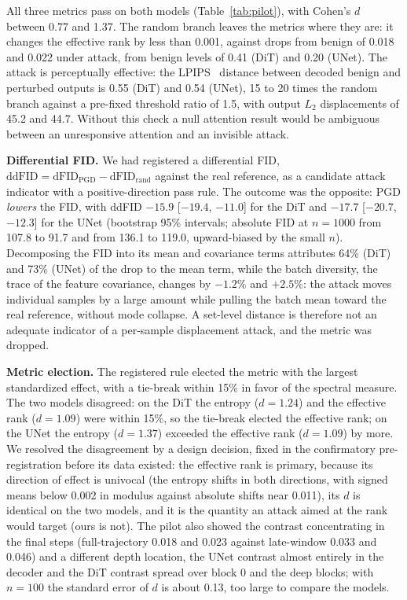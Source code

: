\documentclass{article}
\begin{document}
All three metrics pass on both models (Table~\ref{tab:pilot}), with Cohen's $d$ between 0.77 and 1.37. The random branch leaves the metrics where they are: it changes the effective rank by less than 0.001, against drops from benign of 0.018 and 0.022 under attack, from benign levels of 0.41 (DiT) and 0.20 (UNet). The attack is perceptually effective: the LPIPS~\cite{zhang2018unreasonable} distance between decoded benign and perturbed outputs is 0.55 (DiT) and 0.54 (UNet), 15 to 20 times the random branch against a pre-fixed threshold ratio of 1.5, with output $L_2$ displacements of 45.2 and 44.7. Without this check a null attention result would be ambiguous between an unresponsive attention and an invisible attack.

\textbf{Differential FID.} We had registered a differential FID, $\mathrm{ddFID} = \mathrm{dFID}_{\mathrm{PGD}} - \mathrm{dFID}_{\mathrm{rand}}$ against the real reference, as a candidate attack indicator with a positive-direction pass rule. The outcome was the opposite: PGD \textit{lowers} the FID, with ddFID $-15.9$ [$-19.4$, $-11.0$] for the DiT and $-17.7$ [$-20.7$, $-12.3$] for the UNet (bootstrap 95\% intervals; absolute FID at $n{=}1000$ from 107.8 to 91.7 and from 136.1 to 119.0, upward-biased by the small $n$). Decomposing the FID into its mean and covariance terms attributes 64\% (DiT) and 73\% (UNet) of the drop to the mean term, while the batch diversity, the trace of the feature covariance, changes by $-1.2\%$ and $+2.5\%$: the attack moves individual samples by a large amount while pulling the batch mean toward the real reference, without mode collapse. A set-level distance is therefore not an adequate indicator of a per-sample displacement attack, and the metric was dropped.

\textbf{Metric election.} The registered rule elected the metric with the largest standardized effect, with a tie-break within 15\% in favor of the spectral measure. The two models disagreed: on the DiT the entropy ($d{=}1.24$) and the effective rank ($d{=}1.09$) were within 15\%, so the tie-break elected the effective rank; on the UNet the entropy ($d{=}1.37$) exceeded the effective rank ($d{=}1.09$) by more. We resolved the disagreement by a design decision, fixed in the confirmatory pre-registration before its data existed: the effective rank is primary, because its direction of effect is univocal (the entropy shifts in both directions, with signed means below 0.002 in modulus against absolute shifts near 0.011), its $d$ is identical on the two models, and it is the quantity an attack aimed at the rank would target (ours is not). The pilot also showed the contrast concentrating in the final steps (full-trajectory 0.018 and 0.023 against late-window 0.033 and 0.046) and a different depth location, the UNet contrast almost entirely in the decoder and the DiT contrast spread over block 0 and the deep blocks; with $n{=}100$ the standard error of $d$ is about 0.13, too large to compare the models.
\end{document}

